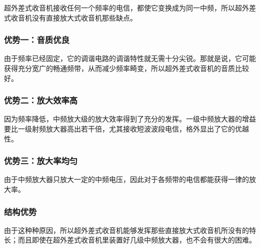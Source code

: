 超外差式收音机接收任何一个频率的电信，都使它变换成为同一中频，所以超外差式收音机没有直接放大式收音机那些缺点。

\subsubsection{优势一：音质优良}

由于频率已经固定，它的调谐电路的调谐特性就无需十分尖锐。那就是说，它可能获得充分宽广的畅通频带，从而减少频率畸变，所以超外差式收音机的音质比较好。

\subsubsection{优势二：放大效率高}

因为频率降低，中频放大级的放大效率得到了充分的发挥。一级中频放大器的增益要比一级射频放大器高出若干倍，尤其接收短波波段电信，格外显出了它的优越性。

\subsubsection{优势三：放大率均匀}

由于中频放大器只放大一定的中频电压，因此对于各频带的电信都能获得一律的放大率。

\subsubsection{结构优势}

由于这种种原因，所以超外差式收音机能够发挥那些直接放大式收音机所没有的特长；而且即使在超外差式收音机里装置好几级中频放大器，也不会有很大的困难。

